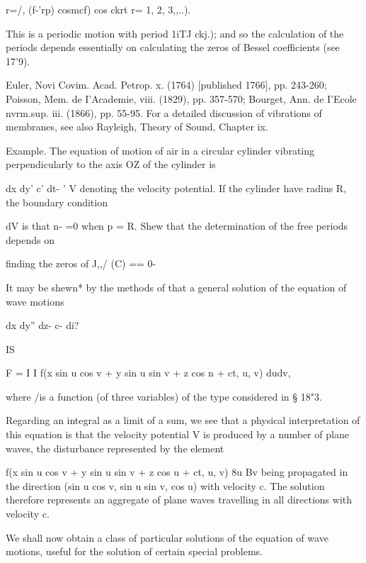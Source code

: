 r=/, (f-'rp) cosmcf) cos ckrt r= 1, 2, 3,,..).

This is a periodic motion with period 1iTJ ckj.); and so the
calculation of the periods depends essentially on calculating the
zeros of Bessel coefficients (see 17'9).

 Euler, Novi Covim. Acad. Petrop. x. (1764) [published 1766], pp.
243-260; Poisson, Mem. de I'Academie, viii. (1829), pp. 357-570;
Bourget, Ann. de I'Ecole nvrm.sup. iii. (1866), pp. 55-95. For a
detailed discussion of vibrations of membranes, see also Rayleigh,
Theory of Sound, Chapter ix.

%
%

Example. The equation of motion of air in a circular cylinder
vibrating perpendicularly to the axis OZ of the cylinder is

dx dy' c' dt- ' V denoting the velocity potential. If the cylinder
have radius R, the boundary condition

dV is that n- =0 when p = R. Shew that the determination of the free
periods depends on

finding the zeros of J,,/ (C) == 0-

It may be
shewn* by the methods of  that a general solution of the equation
of wave motions

dx dy'' dz- c- di?

IS

F = I I f(x sin u cos v + y sin u sin v + z cos n + ct, u, v) dudv,

where /is a function (of three variables) of the type considered in §
18"3.

Regarding an integral as a limit of a sum, we see that a physical
interpretation of this equation is that the velocity potential V is
produced by a number of plane waves, the disturbance represented by
the element

f(x sin u cos v + y sin u sin v + z cos u + ct, u, v) 8u Bv being
propagated in the direction (sin u cos v, sin u sin v, cos u) with
velocity c. The solution therefore represents an aggregate of plane
waves travelling in all directions with velocity c.


We shall now obtain a class of particular solutions of the equation of
wave motions, useful for the solution of certain special problems.

